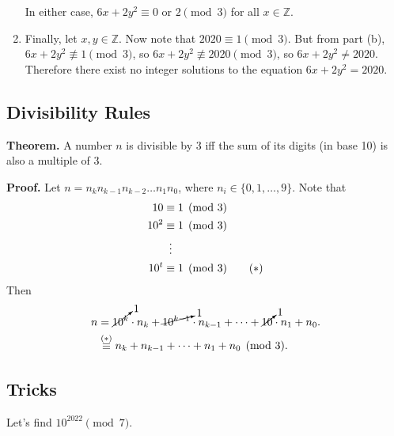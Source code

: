 \documentclass{article}
\begin{document}
\begin{enumerate}[label = \arabic*.]
        In either case, $6x + 2y^2 \equiv 0$ or $2 \pmod{3}$ for all $x \in \mathbb{Z}$.
        \item Finally, let $x, y \in \mathbb{Z}$. Now note that $2020 \equiv 1 \pmod{3}$. But from part (b), $6x + 2y^{2} \not\equiv 1 \pmod{3}$, so $6x + 2y^{2} \not\equiv 2020 \pmod{3}$, so $6x + 2y^{2} \ne 2020$. Therefore there exist no integer solutions to the equation $6x + 2y^{2} = 2020$.
    \end{enumerate}

\subsection*{Divisibility Rules}
    \textbf{Theorem. } A number $n$ is divisible by $3$ iff the sum of its digits (in base 10) is also a multiple of $3$.
    
    \vspace{1.5mm}
    \textbf{Proof. } Let $n = n_{k}n_{k - 1}n_{k - 2}\dots n_{1}n_{0}$, where $n_{i} \in \{0, 1, \dots, 9\}$. Note that 
    \begin{align*}
        10 &\equiv 1 \pmod{3} \\
        10^{2} &\equiv 1 \pmod{3} \\
        &\vdotswithin{ = } \\
        10^{t} &\equiv 1 \pmod{3} \tag{$*$}
    \end{align*}
    Then 
    $$\begin{aligned}[t]
        n &= \cancelto{1}{10^{k}} \cdot n_{k} + \cancelto{1}{10^{k - 1}} \cdot n_{k - 1} + \dots + \cancelto{1}{10} \cdot n_{1} + n_{0}. \\
        &\stackrel{(*)}{\equiv} n_{k} + n_{k - 1} + \dots + n_{1} + n_{0} \pmod{3}.
    \end{aligned}$$

\subsection*{Tricks}
    Let's find $10^{2022} \pmod{7}$.
    
\end{document}
